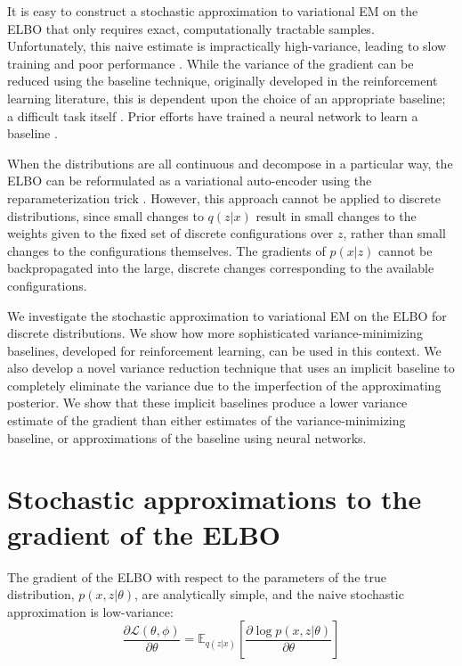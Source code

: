 \documentclass{article} %
\begin{document}
It is easy to construct a stochastic approximation to variational EM on the ELBO that only requires exact, computationally tractable samples.  Unfortunately, this naive estimate is impractically high-variance, leading to slow training and poor performance \cite{paisley2012variational}.  While the variance of the gradient can be reduced using the baseline technique, originally developed in the reinforcement learning literature, this is dependent upon the choice of an appropriate baseline; a difficult task itself \cite{williams1992simple}.  Prior efforts have trained a neural network to learn a baseline \cite{mnih2014neural}.  

When the distributions are all continuous and decompose in a particular way, the ELBO can be reformulated as a variational auto-encoder using the reparameterization trick \cite{kingma2013auto}.  However, this approach cannot be applied to discrete distributions, since small changes to $q(z|x)$ result in small changes to the weights given to the fixed set of discrete configurations over $z$, rather than small changes to the configurations themselves.  The gradients of $p(x | z)$ cannot be backpropagated into the large, discrete changes corresponding to the available configurations.

We investigate the stochastic approximation to variational EM on the ELBO for discrete distributions. We show how more sophisticated variance-minimizing baselines, developed for reinforcement learning, can be used in this context.  We also develop a novel variance reduction technique that uses an implicit baseline to completely eliminate the variance due to the imperfection of the approximating posterior.  We show that these implicit baselines produce a lower variance estimate of the gradient than either estimates of the variance-minimizing baseline, or approximations of the baseline using neural networks.  

\section{Stochastic approximations to the gradient of the ELBO}

The gradient of the ELBO with respect to the parameters of the true distribution, $p(x,z|\theta)$, are analytically simple, and the naive stochastic approximation is low-variance:
\begin{equation*}
\frac{\partial \mathcal{L}(\theta, \phi)}{\partial \theta} = \mathbb{E}_{q(z|x)} \left[ \frac{\partial \log p(x,z | \theta)}{\partial \theta} \right]
\end{equation*}
\end{document}
